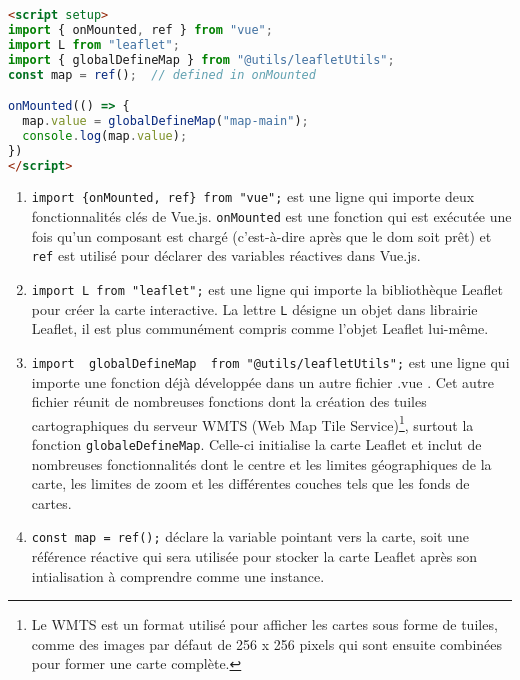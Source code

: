 \begin{lstlisting}[language=HTML, caption=Code HTML du fond de carte pour la balise <script> en Vue.js]
<script setup>
import { onMounted, ref } from "vue";
import L from "leaflet";
import { globalDefineMap } from "@utils/leafletUtils";
const map = ref();  // defined in onMounted

onMounted(() => {
  map.value = globalDefineMap("map-main");
  console.log(map.value);
})
</script>
\end{lstlisting}

\begin{enumerate}
    \item\texttt{import \{onMounted, ref\} from "vue";} est une ligne qui importe deux fonctionnalités clés de Vue.js.  \texttt{onMounted} est une fonction qui est exécutée une fois qu'un composant est chargé (c'est-à-dire après que le \acrshort{dom} soit prêt) et \texttt{ref} est utilisé pour déclarer des variables réactives dans Vue.js. 
    \item\texttt{import L from "leaflet";} est une ligne qui importe la bibliothèque Leaflet pour créer la carte interactive. La lettre \texttt{L} désigne un objet dans librairie Leaflet, il est plus communément compris comme l'objet Leaflet lui-même. 
    \item \texttt{import { globalDefineMap } from "@utils/leafletUtils";} est une ligne qui importe une fonction déjà développée dans un autre fichier .vue . Cet autre fichier réunit de nombreuses fonctions dont la création des tuiles cartographiques du serveur WMTS (Web Map Tile Service)\footnote{Le WMTS est un format utilisé pour afficher les cartes sous forme de tuiles, comme des images par défaut de 256 x 256 pixels qui sont ensuite combinées pour former une carte complète.}, surtout la fonction \texttt{globaleDefineMap}. Celle-ci initialise la carte Leaflet et inclut de nombreuses fonctionnalités dont le centre et les limites géographiques de la carte, les limites de zoom et les différentes couches tels que les fonds de cartes. 
    \item  \texttt{const map = ref();} déclare la variable pointant vers la carte, soit une référence réactive qui sera utilisée pour stocker la carte Leaflet après son intialisation à comprendre comme une instance.
\end{enumerate}

